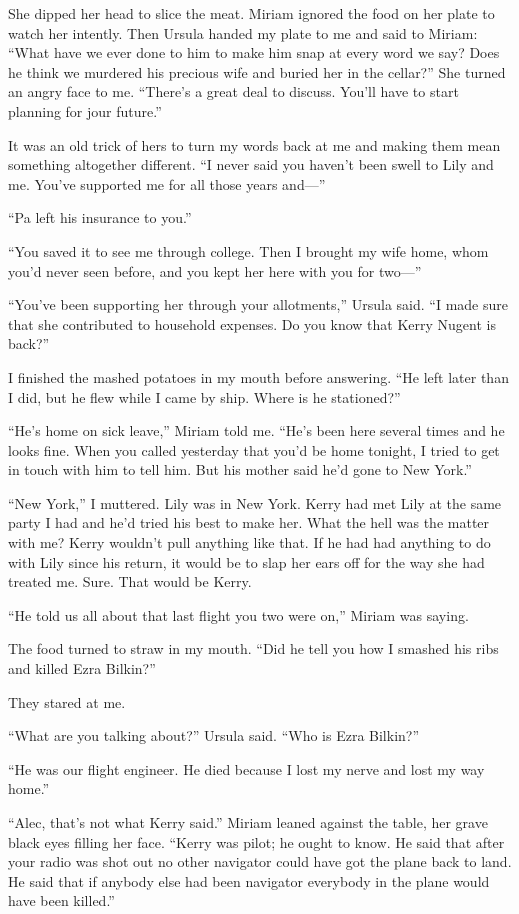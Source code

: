 \documentclass{novel}
\begin{document}
She dipped her head to slice the meat. Miriam ignored the food on her plate to watch her intently. Then Ursula handed my plate to me and said to Miriam: “What have we ever done to him to make him snap at every word we say? Does he think we murdered his precious wife and buried her in the cellar?” She turned an angry face to me. “There’s a great deal to discuss. You’ll have to start planning for jour future.”

It was an old trick of hers to turn my words back at me and making them mean something altogether different. “I never said you haven’t been swell to Lily and me. You’ve supported me for all those years and—”

“Pa left his insurance to you.”

“You saved it to see me through college. Then I brought my wife home, whom you’d never seen before, and you kept her here with you for two—”

“You’ve been supporting her through your allotments,” Ursula said. “I made sure that she contributed to household expenses. Do you know that Kerry Nugent is back?”

I finished the mashed potatoes in my mouth before answering. “He left later than I did, but he flew while I came by ship. Where is he stationed?”

“He’s home on sick leave,” Miriam told me. “He’s been here several times and he looks fine. When you called yesterday that you’d be home tonight, I tried to get in touch with him to tell him. But his mother said he’d gone to New York.”

“New York,” I muttered. Lily was in New York. Kerry had met Lily at the same party I had and he’d tried his best to make her. What the hell was the matter with me? Kerry wouldn’t pull anything like that. If he had had anything to do with Lily since his return, it would be to slap her ears off for the way she had treated me. Sure. That would be Kerry.

“He told us all about that last flight you two were on,” Miriam was saying.

The food turned to straw in my mouth. “Did he tell you how I smashed his ribs and killed Ezra Bilkin?”

They stared at me.

“What are you talking about?” Ursula said. “Who is Ezra Bilkin?”

“He was our flight engineer. He died because I lost my nerve and lost my way home.”

“Alec, that’s not what Kerry said.” Miriam leaned against the table, her grave black eyes filling her face. “Kerry was pilot; he ought to know. He said that after your radio was shot out no other navigator could have got the plane back to land. He said that if anybody else had been navigator everybody in the plane would have been killed.”
\end{document}

